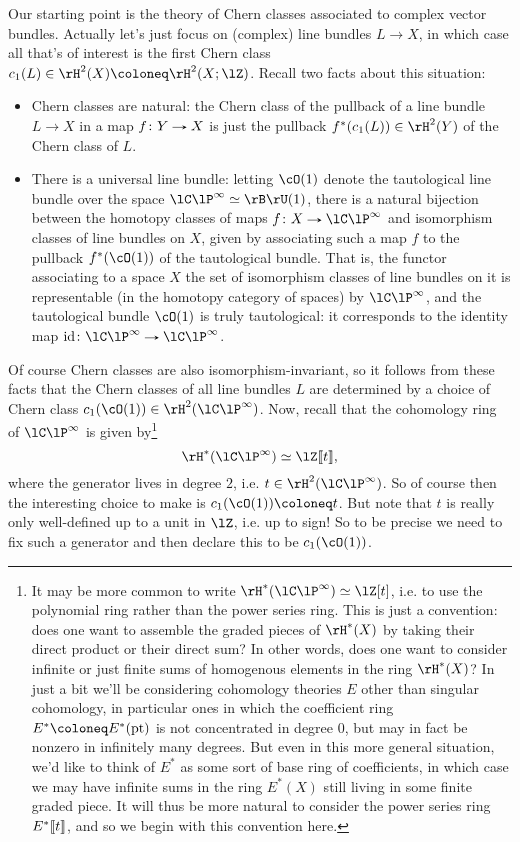 Our starting point is the theory of Chern classes associated to
complex vector bundles. Actually let's just focus on (complex) line
bundles $L \to X$, in which case all that's of interest is the first
Chern class $c_1(L) \in \rH^2(X) \ce \rH^2(X;\lZ)$. Recall two facts
about this situation:
\begin{itemize}
\item Chern classes are natural: the Chern class of the pullback of a
  line bundle $L \to X$ in a map $f \c Y \to X$ is just the pullback
  $f^*(c_1(L)) \in \rH^2(Y)$ of the Chern class of $L$.
\item There is a universal line bundle: letting $\cO(1)$ denote the
  tautological line bundle over the space $\CP^\infty \iso \rB\rU(1)$,
  there is a natural bijection between the homotopy classes of maps
  $f \c X \to \CP^\infty$ and isomorphism classes of line bundles on
  $X$, given by associating such a map $f$ to the pullback
  $f^*(\cO(1))$ of the tautological bundle. That is, the functor
  associating to a space $X$ the set of isomorphism classes of line
  bundles on it is representable (in the homotopy category of spaces)
  by $\CP^\infty$, and the tautological bundle $\cO(1)$ is truly
  tautological: it corresponds to the identity map
  $\id \c \CP^\infty \to \CP^\infty$.
\end{itemize}
Of course Chern classes are also isomorphism-invariant, so it follows
from these facts that the Chern classes of all line bundles $L$ are
determined by a choice of Chern class
$c_1(\cO(1)) \in \rH^2(\CP^\infty)$. Now, recall that the cohomology
ring of $\CP^\infty$ is given by\footnote{It may be more common to
  write $\rH^*(\CP^\infty) \iso \lZ[t]$, i.e. to use the polynomial
  ring rather than the power series ring. This is just a convention:
  does one want to assemble the graded pieces of $\rH^*(X)$ by taking
  their direct product or their direct sum? In other words, does one
  want to consider infinite or just finite sums of homogenous elements
  in the ring $\rH^*(X)$? In just a bit we'll be considering
  cohomology theories $E$ other than singular cohomology, in
  particular ones in which the coefficient ring $E^* \ce E^*(\pt)$ is
  not concentrated in degree $0$, but may in fact be nonzero in
  infinitely many degrees. But even in this more general situation,
  we'd like to think of $E^*$ as some sort of base ring of
  coefficients, in which case we may have infinite sums in the ring
  $E^*(X)$ still living in some finite graded piece. It will thus be
  more natural to consider the power series ring $E^* \llbracket t \rrbracket$, and so we
  begin with this convention here.}
\[
\rH^*(\CP^\infty) \iso \lZ \ldb t \rdb,
\]
where the generator lives in degree $2$, i.e.
$t \in \rH^2(\CP^\infty)$. So of course then the interesting choice to
make is $c_1(\cO(1)) \ce t$. But note that $t$ is really only
well-defined up to a unit in $\lZ$, i.e. up to sign! So to be precise
we need to fix such a generator and then declare this to be
$c_1(\cO(1))$.

